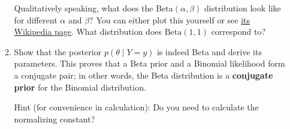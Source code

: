 \documentclass[submit]{harvardml}
\DeclareMathOperator*{\mean}{\mathbb{E}}
\begin{document}
\begin{problem}
\begin{enumerate}
\begin{enumerate}

            Qualitatively speaking, what does the $\mathrm{Beta}(\alpha, \beta)$ distribution look like for different $\alpha$ and $\beta$? You can either plot this yourself or see \href{https://en.wikipedia.org/wiki/Beta_distribution}{its Wikipedia page}. What distribution does $\mathrm{Beta}(1, 1)$ correspond to?

      \item
            Show that the posterior
            \(p(\theta \mid Y=y)\) is indeed Beta and derive its parameters. This proves that a Beta prior and a Binomial likelihood form a conjugate pair; in other words, the Beta distribution is a \textbf{conjugate prior} for the Binomial distribution.

            Hint (for convenience in calculation): Do you need to calculate the normalizing constant?


    \end{enumerate}

\end{enumerate}
\end{problem}

\newpage
\end{document}
